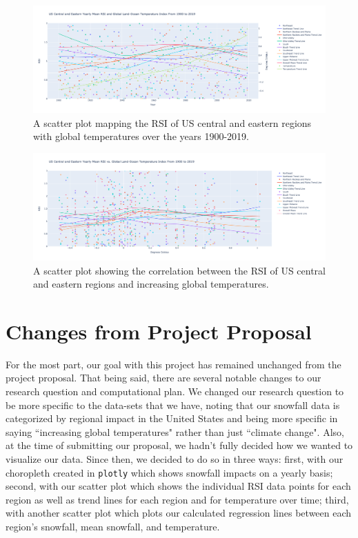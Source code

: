 \documentclass[fontsize=11pt]{article}
\begin{document}
\begin{figure}[h]
    \centering 
    \includegraphics[scale=.2]{year_comparison_scatter_plot_wide.png}
    \caption{A scatter plot mapping the RSI of US central and eastern regions with global temperatures over the years 1900-2019.}
    \label{fig:my_label}
    \end{figure}
\begin{figure}[h]
    \centering
    \includegraphics[scale=.2]{correlation_scatter_plot_wide.png}
    \caption{A scatter plot showing the correlation between the RSI of US central and eastern regions and increasing global temperatures.}
    \label{fig:my_label}
\end{figure}



\section*{Changes from Project Proposal}
For the most part, our goal with this project has remained unchanged from the project proposal. That being said, there are several notable changes to our research question and computational plan. We changed our research question to be more specific to the data-sets that we have, noting that our snowfall data is categorized by regional impact in the United States and being more specific in saying ``increasing global temperatures" rather than just ``climate change". Also, at the time of submitting our proposal, we hadn't fully decided how we wanted to visualize our data. Since then, we decided to do so in three ways: first, with our choropleth created in \texttt{plotly} which shows snowfall impacts on a yearly basis; second, with our scatter plot which shows the individual RSI data points for each region as well as trend lines for each region and for temperature over time; third, with another scatter plot which plots our calculated regression lines between each region's snowfall, mean snowfall, and temperature.
\end{document}
